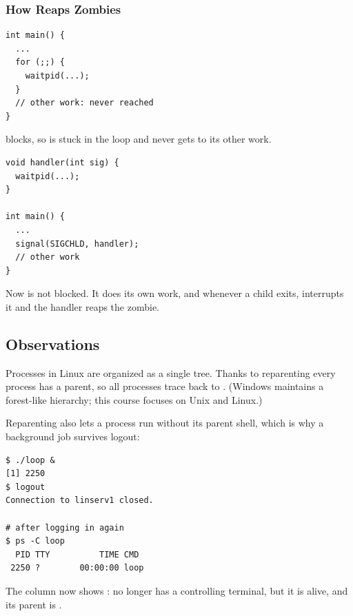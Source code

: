\subsubsection{How \texorpdfstring{}{init} Reaps Zombies}

\begin{example}
\begin{lstlisting}
int main() {
  ...
  for (;;) {
    waitpid(...);
  }
  // other work: never reached
}
\end{lstlisting}
   blocks, so  is stuck in the loop and never gets to its other work.
\end{example}

\begin{example}
\begin{lstlisting}
void handler(int sig) {
  waitpid(...);
}

int main() {
  ...
  signal(SIGCHLD, handler);
  // other work
}
\end{lstlisting}
  Now  is not blocked. It does its own work, and whenever a child exits,  interrupts it and the handler reaps the zombie.
\end{example}

\subsection{Observations}

\begin{keypoint}
  Processes in Linux are organized as a single tree. Thanks to reparenting every process has a parent, so all processes trace back to . (Windows maintains a forest-like hierarchy; this course focuses on Unix and Linux.)
\end{keypoint}

Reparenting also lets a process run without its parent shell, which is why a background job survives logout:
\begin{lstlisting}[style=sh]
$ ./loop &
[1] 2250
$ logout
Connection to linserv1 closed.

# after logging in again
$ ps -C loop
  PID TTY          TIME CMD
 2250 ?        00:00:00 loop
\end{lstlisting}
The  column now shows :  no longer has a controlling terminal, but it is alive, and its parent is .
